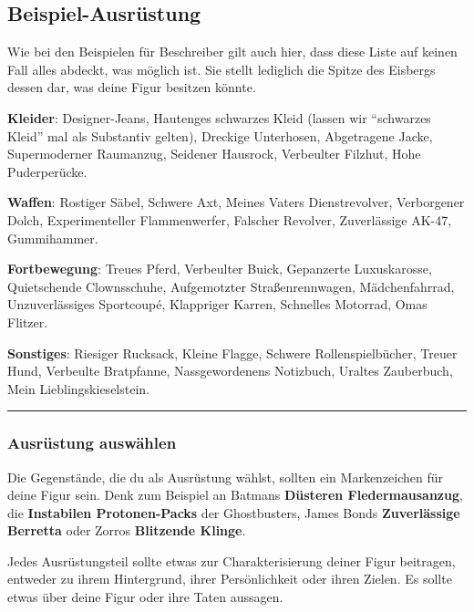 \documentclass[]{article}
\begin{document}
\subsection{Beispiel-Ausrüstung}\label{beispiel-ausruxfcstung}

Wie bei den Beispielen für Beschreiber gilt auch hier, dass diese Liste
auf keinen Fall alles abdeckt, was möglich ist. Sie stellt lediglich die
Spitze des Eisbergs dessen dar, was deine Figur besitzen könnte.

\textbf{Kleider}: Designer-Jeans, Hautenges schwarzes Kleid (lassen wir
``schwarzes Kleid'' mal als Substantiv gelten), Dreckige Unterhosen,
Abgetragene Jacke, Supermoderner Raumanzug, Seidener Hausrock,
Verbeulter Filzhut, Hohe Puderperücke.

\textbf{Waffen}: Rostiger Säbel, Schwere Axt, Meines Vaters
Dienstrevolver, Verborgener Dolch, Experimenteller Flammenwerfer,
Falscher Revolver, Zuverlässige AK-47, Gummihammer.

\textbf{Fortbewegung}: Treues Pferd, Verbeulter Buick, Gepanzerte
Luxuskarosse, Quietschende Clownsschuhe, Aufgemotzter Straßenrennwagen,
Mädchenfahrrad, Unzuverlässiges Sportcoupé, Klappriger Karren, Schnelles
Motorrad, Omas Flitzer.

\textbf{Sonstiges}: Riesiger Rucksack, Kleine Flagge, Schwere
Rollenspielbücher, Treuer Hund, Verbeulte Bratpfanne, Nassgewordenens
Notizbuch, Uraltes Zauberbuch, Mein Lieblingskieselstein.

\begin{center}\rule{0.5\linewidth}{\linethickness}\end{center}

\columnsbegin

\subsubsection{Ausrüstung auswählen}\label{ausruxfcstung-auswuxe4hlen}

Die Gegenstände, die du als Ausrüstung wählst, sollten ein Markenzeichen
für deine Figur sein. Denk zum Beispiel an Batmans \textbf{Düsteren
Fledermausanzug}, die \textbf{Instabilen Protonen-Packs} der
Ghostbusters, James Bonds \textbf{Zuverlässige Berretta} oder Zorros
\textbf{Blitzende Klinge}.

Jedes Ausrüstungsteil sollte etwas zur Charakterisierung deiner Figur
beitragen, entweder zu ihrem Hintergrund, ihrer Persönlichkeit oder
ihren Zielen. Es sollte etwas über deine Figur oder ihre Taten aussagen.
\end{document}
